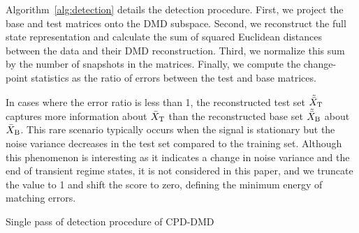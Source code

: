 Algorithm~\ref{alg:detection} details the detection procedure. First, we project the base and test matrices onto the DMD subspace. Second, we reconstruct the full state representation and calculate the sum of squared Euclidean distances between the data and their DMD reconstruction. Third, we normalize this sum by the number of snapshots in the matrices. Finally, we compute the change-point statistics as the ratio of errors between the test and base matrices.

In cases where the error ratio is less than 1, the reconstructed test set \(\tilde{\bar{X}} _{\text{T}}\) captures more information about \(\bar{X} _{\text{T}}\) than the reconstructed base set \(\tilde{\bar{X}} _{\text{B}}\) about \(\bar{X} _{\text{B}}\). This rare scenario typically occurs when the signal is stationary but the noise variance decreases in the test set compared to the training set. Although this phenomenon is interesting as it indicates a change in noise variance and the end of transient regime states, it is not considered in this paper, and we truncate the value to 1 and shift the score to zero, defining the minimum energy of matching errors.

\begin{algorithm}
    \caption{Single pass of detection procedure of CPD-DMD}\label{alg:detection}
    \begin{algorithmic}[1]
    \end{algorithmic}
\end{algorithm}


